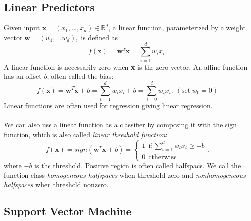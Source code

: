 \documentclass{article}
\begin{document}
   \subsection{Linear Predictors}
   Given input $\textbf{x} = (x_1,...,x_d) \in \mathbb{R}^d$, a linear function, parameterized by a weight vector $\textbf{w} = (w_1,...w_d),$ is defined as
   \begin{equation}
   f(\textbf{x}) = \textbf{w}^T \textbf{x} = \sum_{i=1}^d w_i x_i.
   \end{equation}
   A linear function is necessarily zero when \textbf{x} is the zero vector. An affine function has an offset $b$, often called the bias:
   \begin{equation}
   f(\textbf{x}) = \textbf{w}^T \textbf{x} + b = \sum_{i=1}^d w_i x_i + b = \sum_{i=0}^d w_i x_i. \ \ (\text{set}\ w_0 = 0)
   \end{equation}
   Linear functions are often used for regression giving linear regression.
   \\\\
   We can also use a linear function as a classifier by composing it with the sign function, which is also called \textit{linear threshold function}:
   \begin{equation}
   f(\textbf{x}) = sign(\textbf{w}^T \textbf{x} + b) = 
   		\begin{cases}
   		1\ \ \text{if}\ \sum_{i=1}^d w_i x_i \geq -b\\
        0\ \ \text{otherwise}
   		\end{cases}.
   \end{equation}
   where $-b$ is the threshold. Positive region is often called halfspace. We call the function class \textit{homogeneous halfspaces} when threshold zero and \textit{nonhomogeneous halfspaces} when threshold nonzero.
   
   \subsection{Support Vector Machine}
\end{document}

